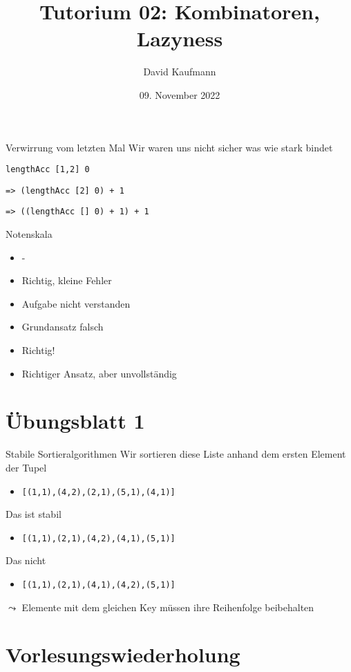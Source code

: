 \documentclass{beamer}
\title{Tutorium 02: Kombinatoren, Lazyness}
\author{David Kaufmann}
\institute{Tutorium Programmierparadigmen am KIT}
\date{09. November 2022}
\begin{document}
\begin{frame}
	\titlepage
\end{frame}

\begin{frame}{Verwirrung vom letzten Mal}
    Wir waren uns nicht sicher was wie stark bindet
    
    \texttt{lengthAcc [1,2] 0}
    
    \texttt{=> (lengthAcc [2] 0) + 1}

    \texttt{=> ((lengthAcc [] 0) + 1) + 1}
\end{frame}

\begin{frame}{Notenskala}
	\begin{itemize}
		\item -
		\item Richtig, kleine Fehler
		\item Aufgabe nicht verstanden
		\item Grundansatz falsch
		\item Richtig!
		\item Richtiger Ansatz, aber unvollständig
	\end{itemize}
\end{frame}

\section{Übungsblatt 1}

\begin{frame}{Stabile Sortieralgorithmen}
    Wir sortieren diese Liste anhand dem ersten Element der Tupel
    \begin{itemize}
        \item \texttt{[(1,1),(4,2),(2,1),(5,1),(4,1)]}
    \end{itemize}
    Das ist stabil
    \begin{itemize}
        \item \texttt{[(1,1),(2,1),(4,2),(4,1),(5,1)]}
    \end{itemize}
    Das nicht 
    \begin{itemize}
        \item \texttt{[(1,1),(2,1),(4,1),(4,2),(5,1)]}
    \end{itemize}
    $\leadsto$ Elemente mit dem gleichen Key müssen ihre Reihenfolge beibehalten
\end{frame}

\section{Vorlesungswiederholung}
\end{document}
